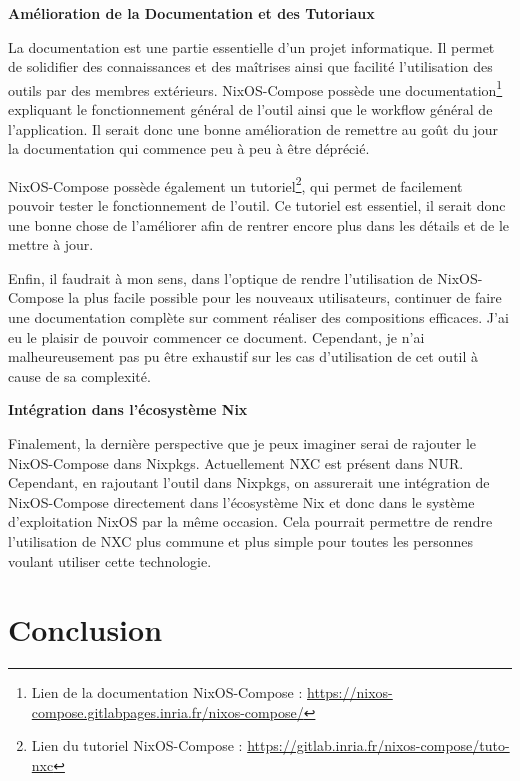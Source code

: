 \documentclass[a4paper,french,12pt, titlepage]{article}
\begin{document}
\textbf{Amélioration de la Documentation et des Tutoriaux}\newline

La documentation est une partie essentielle d'un projet informatique. Il
permet de solidifier des connaissances et des maîtrises ainsi que
facilité l'utilisation des outils par des membres extérieurs.
NixOS-Compose possède une
documentation\footnote{Lien de la documentation NixOS-Compose : \url{https://nixos-compose.gitlabpages.inria.fr/nixos-compose/}}
expliquant le fonctionnement général de l'outil ainsi que le workflow
général de l'application. Il serait donc une bonne amélioration de
remettre au goût du jour la documentation qui commence peu à peu à être
déprécié.\newline

NixOS-Compose possède également un
tutoriel\footnote{Lien du tutoriel NixOS-Compose : \url{https://gitlab.inria.fr/nixos-compose/tuto-nxc}},
qui permet de facilement pouvoir tester le fonctionnement de l'outil. Ce
tutoriel est essentiel, il serait donc une bonne chose de l'améliorer
afin de rentrer encore plus dans les détails et de le mettre à
jour.\newline

Enfin, il faudrait à mon sens, dans l'optique de rendre l'utilisation de
NixOS-Compose la plus facile possible pour les nouveaux utilisateurs,
continuer de faire une documentation complète sur comment réaliser des
compositions efficaces. J'ai eu le plaisir de pouvoir commencer ce
document. Cependant, je n'ai malheureusement pas pu être exhaustif sur
les cas d'utilisation de cet outil à cause de sa complexité.\newline

\textbf{Intégration dans l'écosystème Nix}\newline

Finalement, la dernière perspective que je peux imaginer serai de
rajouter le NixOS-Compose dans Nixpkgs. Actuellement NXC est présent
dans NUR. Cependant, en rajoutant l'outil dans Nixpkgs, on assurerait
une intégration de NixOS-Compose directement dans l'écosystème Nix et
donc dans le système d'exploitation NixOS par la même occasion. Cela
pourrait permettre de rendre l'utilisation de NXC plus commune et plus
simple pour toutes les personnes voulant utiliser cette
technologie.\newline

\newpage

\hypertarget{conclusion}{%
\section{Conclusion}\label{conclusion}}
\end{document}
